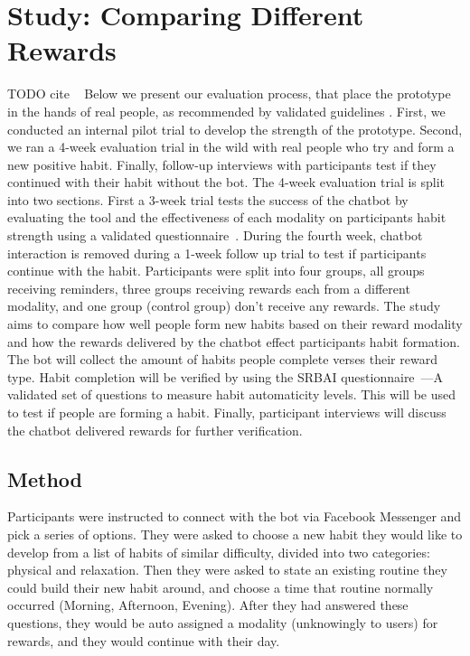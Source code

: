 \documentclass{scaffold/sigchi}
\begin{document}
\section{Study: Comparing Different Rewards}
TODO cite ~\cite{how_to_evaluate_tech_for_behaviour_change}\newline
Below we present our evaluation process, that place the prototype in the hands of real people, as recommended by validated guidelines \cite{article_mhealth}. First, we conducted an internal pilot trial to develop the strength of the prototype. Second, we ran a 4-week evaluation trial in the wild with real people who try and form a new positive habit. Finally, follow-up interviews with participants test if they continued with their habit without the bot.\newline
\newline
The 4-week evaluation trial is split into two sections. First a 3-week trial tests the success of the chatbot by evaluating the tool and the effectiveness of each modality on participants habit strength using a validated questionnaire~\cite{article_habit_measurement}. During the fourth week, chatbot interaction is removed during a 1-week follow up trial to test if participants continue with the habit. Participants were split into four groups, all groups receiving reminders, three groups receiving rewards each from a different modality, and one group (control group) don't receive any rewards.\newline
\newline
The study aims to compare how well people form new habits based on their reward modality and how the rewards delivered by the chatbot effect participants habit formation. The bot will collect the amount of habits people complete verses their reward type. Habit completion will be verified by using the SRBAI questionnaire~\cite{article_habit_measurement}---A validated set of questions to measure habit automaticity levels. This will be used to test if people are forming a habit. Finally, participant interviews will discuss the chatbot delivered rewards for further verification.

\subsection{Method}
Participants were instructed to connect with the bot via Facebook Messenger and pick a series of options. They were asked to choose a new habit they would like to develop from a list of habits of similar difficulty, divided into two categories: physical and relaxation. Then they were asked to state an existing routine they could build their new habit around, and choose a time that routine normally occurred (Morning, Afternoon, Evening). After they had answered these questions, they would be auto assigned a modality (unknowingly to users) for rewards, and they would continue with their day.
\end{document}
